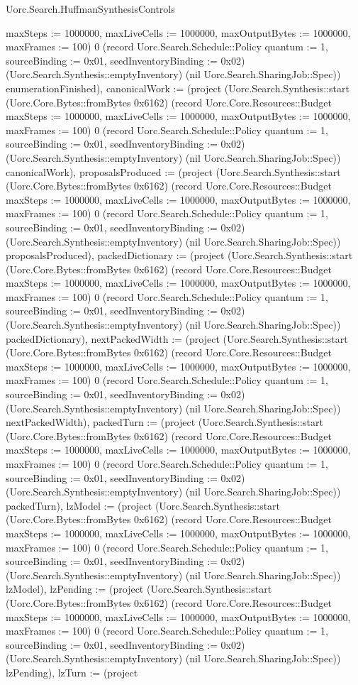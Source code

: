 \begin{lexlean}{Uorc.Search.HuffmanSynthesisControls}
\begin{semanticmodule}
{{maxSteps := 1000000, maxLiveCells := 1000000, maxOutputBytes := 1000000, maxFrames := 100}) 0 (record Uorc.Search.Schedule::Policy {quantum := 1, sourceBinding := 0x01, seedInventoryBinding := 0x02}) (Uorc.Search.Synthesis::emptyInventory) (nil Uorc.Search.SharingJob::Spec)) enumerationFinished), canonicalWork := (project (Uorc.Search.Synthesis::start (Uorc.Core.Bytes::fromBytes 0x6162) (record Uorc.Core.Resources::Budget {maxSteps := 1000000, maxLiveCells := 1000000, maxOutputBytes := 1000000, maxFrames := 100}) 0 (record Uorc.Search.Schedule::Policy {quantum := 1, sourceBinding := 0x01, seedInventoryBinding := 0x02}) (Uorc.Search.Synthesis::emptyInventory) (nil Uorc.Search.SharingJob::Spec)) canonicalWork), proposalsProduced := (project (Uorc.Search.Synthesis::start (Uorc.Core.Bytes::fromBytes 0x6162) (record Uorc.Core.Resources::Budget {maxSteps := 1000000, maxLiveCells := 1000000, maxOutputBytes := 1000000, maxFrames := 100}) 0 (record Uorc.Search.Schedule::Policy {quantum := 1, sourceBinding := 0x01, seedInventoryBinding := 0x02}) (Uorc.Search.Synthesis::emptyInventory) (nil Uorc.Search.SharingJob::Spec)) proposalsProduced), packedDictionary := (project (Uorc.Search.Synthesis::start (Uorc.Core.Bytes::fromBytes 0x6162) (record Uorc.Core.Resources::Budget {maxSteps := 1000000, maxLiveCells := 1000000, maxOutputBytes := 1000000, maxFrames := 100}) 0 (record Uorc.Search.Schedule::Policy {quantum := 1, sourceBinding := 0x01, seedInventoryBinding := 0x02}) (Uorc.Search.Synthesis::emptyInventory) (nil Uorc.Search.SharingJob::Spec)) packedDictionary), nextPackedWidth := (project (Uorc.Search.Synthesis::start (Uorc.Core.Bytes::fromBytes 0x6162) (record Uorc.Core.Resources::Budget {maxSteps := 1000000, maxLiveCells := 1000000, maxOutputBytes := 1000000, maxFrames := 100}) 0 (record Uorc.Search.Schedule::Policy {quantum := 1, sourceBinding := 0x01, seedInventoryBinding := 0x02}) (Uorc.Search.Synthesis::emptyInventory) (nil Uorc.Search.SharingJob::Spec)) nextPackedWidth), packedTurn := (project (Uorc.Search.Synthesis::start (Uorc.Core.Bytes::fromBytes 0x6162) (record Uorc.Core.Resources::Budget {maxSteps := 1000000, maxLiveCells := 1000000, maxOutputBytes := 1000000, maxFrames := 100}) 0 (record Uorc.Search.Schedule::Policy {quantum := 1, sourceBinding := 0x01, seedInventoryBinding := 0x02}) (Uorc.Search.Synthesis::emptyInventory) (nil Uorc.Search.SharingJob::Spec)) packedTurn), lzModel := (project (Uorc.Search.Synthesis::start (Uorc.Core.Bytes::fromBytes 0x6162) (record Uorc.Core.Resources::Budget {maxSteps := 1000000, maxLiveCells := 1000000, maxOutputBytes := 1000000, maxFrames := 100}) 0 (record Uorc.Search.Schedule::Policy {quantum := 1, sourceBinding := 0x01, seedInventoryBinding := 0x02}) (Uorc.Search.Synthesis::emptyInventory) (nil Uorc.Search.SharingJob::Spec)) lzModel), lzPending := (project (Uorc.Search.Synthesis::start (Uorc.Core.Bytes::fromBytes 0x6162) (record Uorc.Core.Resources::Budget {maxSteps := 1000000, maxLiveCells := 1000000, maxOutputBytes := 1000000, maxFrames := 100}) 0 (record Uorc.Search.Schedule::Policy {quantum := 1, sourceBinding := 0x01, seedInventoryBinding := 0x02}) (Uorc.Search.Synthesis::emptyInventory) (nil Uorc.Search.SharingJob::Spec)) lzPending), lzTurn := (project }
\end{semanticmodule}
\end{lexlean}
